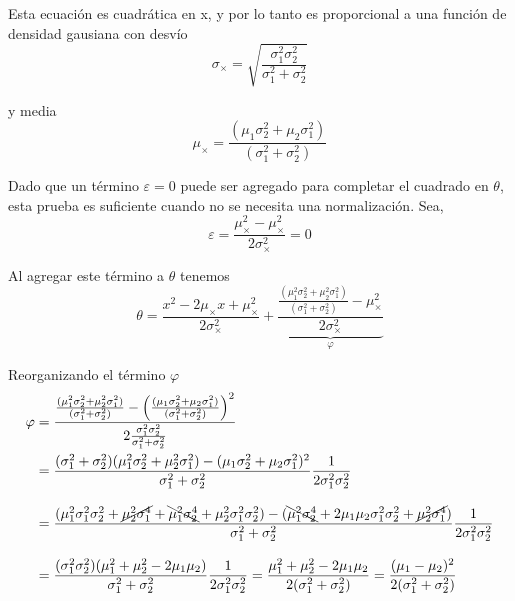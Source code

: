 \documentclass[article]{jss}
\begin{document}
\begin{appendix}
Esta ecuaci\'on es cuadr\'atica en x, y por lo tanto es proporcional a una funci\'on de densidad gausiana con desv\'io
\begin{equation}
\sigma_{\times} = \sqrt{\frac{\sigma_1^2\sigma_2^2}{\sigma_1^2+\sigma_2^2}}  
\end{equation}

y media
\begin{equation}
 \mu_{\times} = \frac{(\mu_1\sigma_2^2 + \mu_2\sigma_1^2)}{(\sigma_1^2 + \sigma_2^2) }
\end{equation}

Dado que un t\'ermino $\varepsilon = 0$ puede ser agregado para completar el cuadrado en $\theta$, esta prueba es suficiente cuando no se necesita una normalizaci\'on.
Sea, 
\begin{equation}
 \varepsilon = \frac{\mu_{\times}^2-\mu_{\times}^2}{2\sigma_{\times}^2} = 0
\end{equation}

Al agregar este t\'ermino a $\theta$ tenemos
\begin{equation}
 \theta = \frac{x^2 - 2\mu_{\times}x + \mu_{\times}^2 }{2\sigma_{\times}^2} + \underbrace{\frac{ \frac{(\mu_1^2\sigma_2^2 + \mu_2^2\sigma_1^2)}{(\sigma_1^2 + \sigma_2^2) } - \mu_{\times}^2}{2\sigma_{\times}^2}}_{\varphi}
\end{equation}

Reorganizando el t\'ermino $\varphi$
\begin{equation}
\begin{split}
\varphi & = \frac{\frac{(\mu_1^2\sigma_2^2 + \mu_2^2\sigma_1^2)}{(\sigma_1^2 + \sigma_2^2) } - \left(\frac{(\mu_1\sigma_2^2 + \mu_2\sigma_1^2)}{(\sigma_1^2 + \sigma_2^2) }\right)^2 }{2\frac{\sigma_1^2\sigma_2^2}{\sigma_1^2+\sigma_2^2}}  \\
& = \frac{(\sigma_1^2 + \sigma_2^2)(\mu_1^2\sigma_2^2 + \mu_2^2\sigma_1^2) - (\mu_1\sigma_2^2 + \mu_2\sigma_1^2)^2}{\sigma_1^2 + \sigma_2^2}\frac{1}{2\sigma_1^2\sigma_2^2} \\[0.3cm]
& = \frac{(\mu_1^2\sigma_1^2\sigma_2^2 + \cancel{\mu_2^2\sigma_1^4} + \bcancel{\mu_1^2\sigma_2^4} + \mu_2^2\sigma_1^2\sigma_2^2) - (\bcancel{\mu_1^2\sigma_2^4} + 2\mu_1\mu_2\sigma_1^2\sigma_2^2 + \cancel{\mu_2^2\sigma_1^4} )}{\sigma_1^2 + \sigma_2^2}  \frac{1}{2\sigma_1^2\sigma_2^2} \\[0.3cm] 
& = \frac{(\sigma_1^2\sigma_2^2)(\mu_1^2 + \mu_2^2 - 2\mu_1\mu_2)}{\sigma_1^2 + \sigma_2^2}\frac{1}{2\sigma_1^2\sigma_2^2} = \frac{\mu_1^2 + \mu_2^2 - 2\mu_1\mu_2}{2(\sigma_1^2 + \sigma_2^2)} = \frac{(\mu_1 - \mu_2)^2}{2(\sigma_1^2 + \sigma_2^2)}
\end{split}
\end{equation}


\end{appendix}
\end{document}
